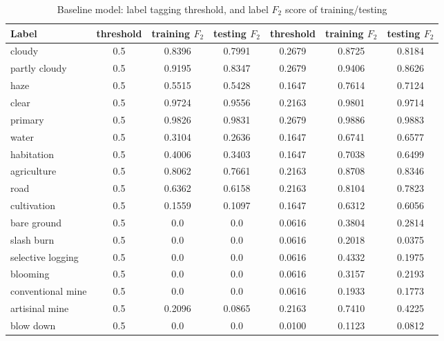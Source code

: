 \documentclass[11pt,oneside,a4paper]{article}
\begin{document}
\begin{table}[ht]
\begin{tabular}{l|c|c|c|c|c|c}
\hline
\hline
Label      & threshold & training $F_2$ & testing $F_2$ & threshold & training $F_2$ & testing $F_2$ \\\hline
cloudy            & 0.5  & 0.8396 & 0.7991 & 0.2679  & 0.8725 & 0.8184 \\ 
partly cloudy     & 0.5  & 0.9195 & 0.8347 & 0.2679  & 0.9406 & 0.8626 \\  
haze              & 0.5  & 0.5515 & 0.5428 & 0.1647  & 0.7614 & 0.7124 \\
clear             & 0.5  & 0.9724 & 0.9556 & 0.2163  & 0.9801 & 0.9714 \\
primary           & 0.5  & 0.9826 & 0.9831 & 0.2679  & 0.9886 & 0.9883 \\
water             & 0.5  & 0.3104 & 0.2636 & 0.1647  & 0.6741 & 0.6577 \\
habitation        & 0.5  & 0.4006 & 0.3403 & 0.1647  & 0.7038 & 0.6499 \\
agriculture       & 0.5  & 0.8062 & 0.7661 & 0.2163  & 0.8708 & 0.8346 \\
road              & 0.5  & 0.6362 & 0.6158 & 0.2163  & 0.8104 & 0.7823 \\
cultivation       & 0.5  & 0.1559 & 0.1097 & 0.1647  & 0.6312 & 0.6056 \\
bare ground       & 0.5  & 0.0    & 0.0    & 0.0616  & 0.3804 & 0.2814 \\
slash burn        & 0.5  & 0.0    & 0.0    & 0.0616  & 0.2018 & 0.0375 \\
selective logging & 0.5  & 0.0    & 0.0    & 0.0616  & 0.4332 & 0.1975 \\
blooming          & 0.5  & 0.0    & 0.0    & 0.0616  & 0.3157 & 0.2193 \\
conventional mine & 0.5  & 0.0    & 0.0    & 0.0616  & 0.1933 & 0.1773 \\
artisinal mine    & 0.5  & 0.2096 & 0.0865 & 0.2163  & 0.7410 & 0.4225 \\
blow down         & 0.5  & 0.0    & 0.0    & 0.0100  & 0.1123 & 0.0812 \\ \hline
\end{tabular}
\caption{Baseline model: label tagging threshold, and label $F_2$ score of training/testing}\label{tab:baseline_f2}
\end{table}
\end{document}
